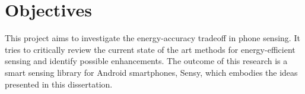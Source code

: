 \section{Objectives}
\label{s:objectives}
This project aims to investigate the energy-accuracy tradeoff in phone sensing. It tries to critically review the current state of the art methods for energy-efficient sensing and identify possible enhancements. The outcome of this research is a smart sensing library for Android smartphones, Sensy, which embodies the ideas presented in this dissertation.